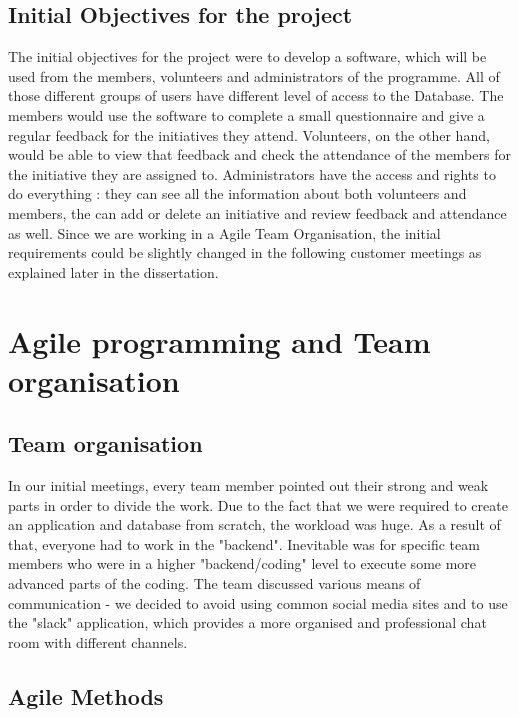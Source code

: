 \documentclass{l3proj}
\begin{document}
\subsection{Initial Objectives for the project}
\label{objectives}

The initial objectives for the project were to develop a software, which will be used from the members, volunteers and administrators of the programme. All of those different groups of users have different level of access to the Database. The members would use the software to  complete a small questionnaire and give a regular feedback for the initiatives they attend. Volunteers, on the other hand, would be able to view that feedback and check the attendance of the members for the initiative they are assigned to. Administrators have the access and rights to do everything : they can see all the information about both volunteers and members, the can add or delete an initiative and review feedback and attendance as well. Since we are working in a Agile Team Organisation, the initial requirements could be slightly changed in the following customer meetings as explained later in the dissertation.

\section{Agile programming and Team organisation}

\subsection{Team organisation}
\label{organisation}

In our initial meetings, every team member pointed out their strong and weak parts in order to divide the work. Due to the fact that we were required to create an application and database from scratch, the workload was huge. As a result of that, everyone had to work in the "backend". Inevitable was for specific team members who were in a higher "backend/coding" level to execute some more advanced parts of the coding.
The team discussed various means of communication - we decided to avoid using common social media sites and to use the "slack" application, which provides a more organised and professional chat room with different channels. 

\subsection{Agile Methods}
\label{agile}
\end{document}
